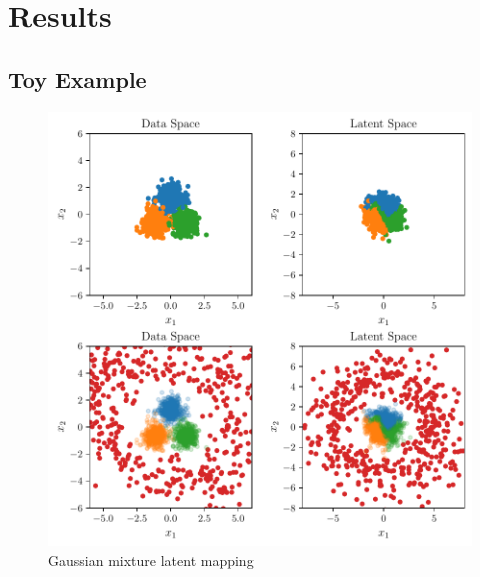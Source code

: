 \chapter{Results}%
\label{cha:results}


\section{Toy Example}%
\label{sec:toy_example}

\begin{figure}[htpb] \centering
        \includegraphics{figures/toy_example/gaussian_mixture/latent_mapping.pdf}
	\caption{Gaussian mixture latent mapping}%
	\label{fig:latent_gmm}
\end{figure}

